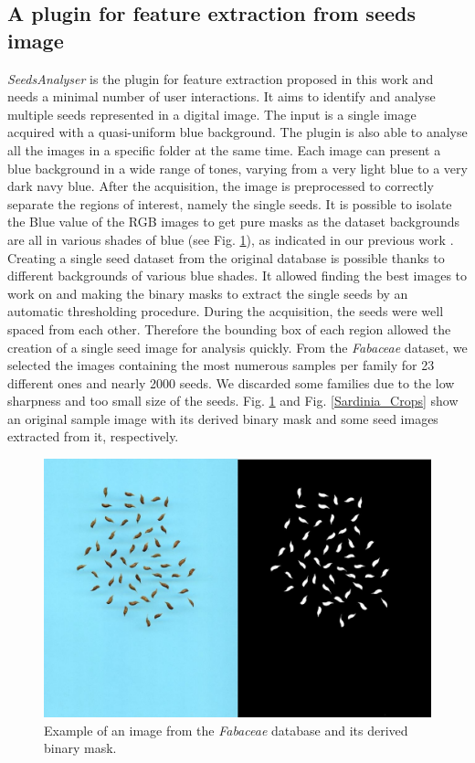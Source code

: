 \documentclass[twocolumn]{svjour3}           %
\begin{document}
\subsection{A plugin for feature extraction from seeds image}
\label{sec:seeds_analyser}
\emph{SeedsAnalyser} is the plugin for feature extraction proposed in this work and needs a minimal number of user interactions. It aims to identify and analyse multiple seeds represented in a digital image. The input is a single image acquired with a quasi-uniform blue background.
The plugin is also able to analyse all the images in a specific folder at the same time. Each image can present a blue background in a wide range of tones, varying from a very light blue to a very dark navy blue. After the acquisition, the image is preprocessed to correctly separate the regions of interest, namely the single seeds. 
It is possible to isolate the Blue value of the RGB images to get pure masks as the dataset backgrounds are all in various shades of blue (see Fig.  \ref{Sardinia_Masks}), as indicated in our previous work \cite{Loddo20}. 
Creating a single seed dataset from the original database is possible thanks to different backgrounds of various blue shades. It allowed finding the best images to work on and making the binary masks to extract the single seeds by an automatic thresholding procedure.
During the acquisition, the seeds were well spaced from each other. Therefore the bounding box of each region allowed the creation of a single seed image for analysis quickly.
From the \emph{Fabaceae} dataset, we selected the images containing the most numerous samples per family for 23 different ones and nearly 2000 seeds.
We discarded some families due to the low sharpness and too small size of the seeds. Fig. \ref{Sardinia_Masks} and Fig. \ref{Sardinia_Crops} show an original sample image with its derived binary mask and some seed images extracted from it, respectively. 
\begin{figure}[htbp]
	\centering
	\includegraphics[scale=0.6]{fig_sardiniaMasks.jpg}
	\caption{Example of an image from the \emph{Fabaceae} database and its derived binary mask.}
	\label{Sardinia_Masks}
\end{figure}
\end{document}
